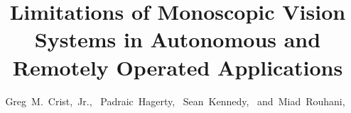 \documentclass[12pt, journal]{IEEEtran}
\begin{document}
%
\title{Limitations of Monoscopic Vision Systems in Autonomous and Remotely Operated Applications}

%
%
%

\author{
    Greg~M.~Crist,~Jr.,~
    Padraic~Hagerty,~
    Sean~Kennedy,~
    and~Miad~Rouhani,~%
}

% 
%
\end{document}
